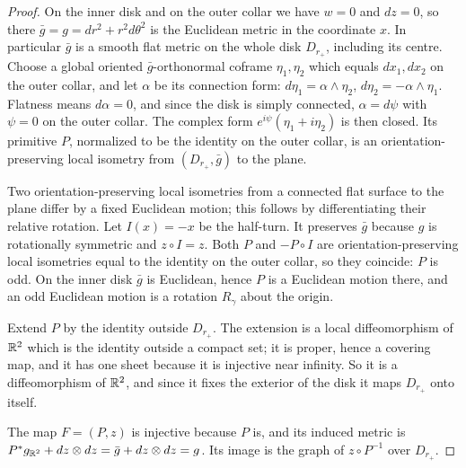\begin{proof}
On the inner disk and on the outer collar we have $w=0$ and $dz=0$, so
there $\bar g=g=dr^2+r^2d\theta^2$ is the Euclidean metric in the
coordinate $x$. In particular $\bar g$ is a smooth flat metric on the
whole disk $D_{r_+}$, including its centre. Choose a global oriented
$\bar g$-orthonormal coframe $\eta_1,\eta_2$ which equals $dx_1,dx_2$
on the outer collar, and let $\alpha$ be its connection form:
$d\eta_1=\alpha\wedge\eta_2$, $d\eta_2=-\alpha\wedge\eta_1$. Flatness
means $d\alpha=0$, and since the disk is simply connected,
$\alpha=d\psi$ with $\psi=0$ on the outer collar. The complex form
$e^{i\psi}(\eta_1+i\eta_2)$ is then closed. Its primitive $P$,
normalized to be the identity on the outer collar, is an
orientation-preserving local isometry from $(D_{r_+},\bar g)$ to the
plane.

Two orientation-preserving local isometries from a connected flat
surface to the plane differ by a fixed Euclidean motion; this follows
by differentiating their relative rotation. Let $I(x)=-x$ be the
half-turn. It preserves $\bar g$ because $g$ is rotationally symmetric
and $z\circ I=z$. Both $P$ and $-P\circ I$ are orientation-preserving
local isometries equal to the identity on the outer collar, so they
coincide: $P$ is odd. On the inner disk $\bar g$ is Euclidean, hence
$P$ is a Euclidean motion there, and an odd Euclidean motion is a
rotation $R_\gamma$ about the origin.

Extend $P$ by the identity outside $D_{r_+}$. The extension is a local
diffeomorphism of $\mathbb R^2$ which is the identity outside a compact set;
it is proper, hence a covering map, and it has one sheet because it is
injective near infinity. So it is a diffeomorphism of $\mathbb R^2$, and
since it fixes the exterior of the disk it maps $D_{r_+}$ onto itself.

The map $F=(P,z)$ is injective because $P$ is, and its induced metric
is $P^*g_{\mathbb R^2}+dz\otimes dz=\bar g+dz\otimes dz=g$. Its image is the
graph of $z\circ P^{-1}$ over $D_{r_+}$.
\end{proof}

